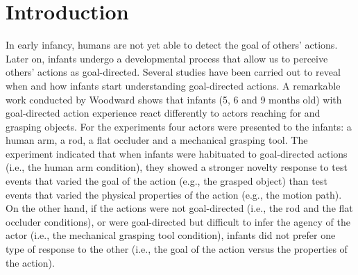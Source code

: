 \documentclass[conference]{IEEEtran}
\begin{document}
\section{Introduction}
In early infancy, humans are not yet able to detect the goal of others' actions. Later on, infants undergo a developmental process that allow us to perceive others' actions as goal-directed. Several studies have been carried out to reveal when and how infants start understanding goal-directed actions. A remarkable work conducted by Woodward \cite{woodward1998infants} shows that infants (5, 6 and 9 months old) with goal-directed action experience react differently to actors reaching for and grasping objects. For the experiments four actors were presented to the infants: a human arm, a rod, a flat occluder and a mechanical grasping tool. The experiment indicated that when infants were habituated to goal-directed actions (i.e., the human arm condition), they showed a stronger novelty response to test events that varied the goal of the action (e.g., the grasped object) than test events that varied the physical properties of the action (e.g., the motion path). On the other hand, if the actions were not goal-directed (i.e., the rod and the flat occluder conditions), or were goal-directed but difficult to infer the agency of the actor (i.e., the mechanical grasping tool condition), infants did not prefer one type of response to the other (i.e., the goal of the action versus the properties of the action).
\end{document}
